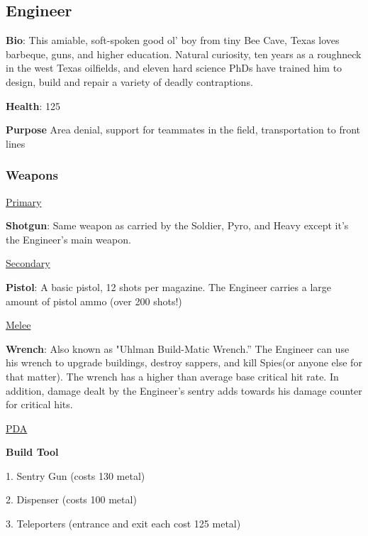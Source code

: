 \subsection{Engineer}
\label{Engineer}
{\bf Bio}:
This amiable, soft-spoken good ol' boy from tiny Bee Cave, Texas loves barbeque, guns, and higher education. Natural curiosity, ten years as a roughneck in the west Texas oilfields, and eleven hard science PhDs have trained him to design, build and repair a variety of deadly contraptions.

{\bf Health}: 125

{\bf Purpose}
Area denial, support for teammates in the field, transportation to front lines

\subsubsection {Weapons}


\begin {center}
\underline {Primary}
\end {center}

{\bf Shotgun}: Same weapon as carried by the Soldier, Pyro, and Heavy except it's the Engineer's main weapon.


\begin {center}
\underline {Secondary}
\end {center}

{\bf Pistol}: A basic pistol, 12 shots per magazine. The Engineer carries a large amount of pistol ammo (over 200 shots!)


\begin {center}
\underline {Melee}
\end {center}

{\bf Wrench}: Also known as "Uhlman Build-Matic Wrench.” The Engineer can use his wrench to upgrade buildings, destroy sappers, and kill Spies(or anyone else for that matter). The wrench has a higher than average base critical hit rate.  In addition, damage dealt by the Engineer's sentry adds towards his damage counter for critical hits.


\begin {center}
\underline {PDA}
\end {center}
{\bf Build Tool}

1.       Sentry Gun (costs 130 metal)

2.       Dispenser (costs 100 metal)

3.       Teleporters (entrance and exit each cost 125 metal)



